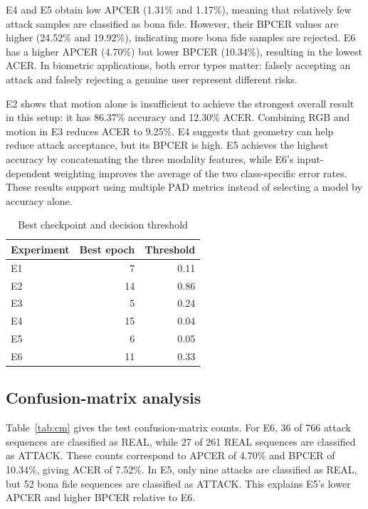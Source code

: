 \documentclass[a4paper,conference]{IEEEtran}
\begin{document}
E4 and E5 obtain low APCER (1.31\% and 1.17\%), meaning that relatively few attack samples are classified as bona fide. However, their BPCER values are higher (24.52\% and 19.92\%), indicating more bona fide samples are rejected. E6 has a higher APCER (4.70\%) but lower BPCER (10.34\%), resulting in the lowest ACER. In biometric applications, both error types matter: falsely accepting an attack and falsely rejecting a genuine user represent different risks.

E2 shows that motion alone is insufficient to achieve the strongest overall result in this setup: it has 86.37\% accuracy and 12.30\% ACER. Combining RGB and motion in E3 reduces ACER to 9.25\%. E4 suggests that geometry can help reduce attack acceptance, but its BPCER is high. E5 achieves the highest accuracy by concatenating the three modality features, while E6's input-dependent weighting improves the average of the two class-specific error rates. These results support using multiple PAD metrics instead of selecting a model by accuracy alone.

\begin{table}[t]
\caption{Best checkpoint and decision threshold}
\label{tab:thresholds}
\centering\footnotesize
\begin{tabular}{lrr}
\toprule
Experiment & Best epoch & Threshold \\
\midrule
E1 & 7 & 0.11 \\
E2 & 14 & 0.86 \\
E3 & 5 & 0.24 \\
E4 & 15 & 0.04 \\
E5 & 6 & 0.05 \\
E6 & 11 & 0.33 \\
\bottomrule
\end{tabular}
\end{table}

\subsection{Confusion-matrix analysis}
Table~\ref{tab:cm} gives the test confusion-matrix counts. For E6, 36 of 766 attack sequences are classified as REAL, while 27 of 261 REAL sequences are classified as ATTACK. These counts correspond to APCER of 4.70\% and BPCER of 10.34\%, giving ACER of 7.52\%. In E5, only nine attacks are classified as REAL, but 52 bona fide sequences are classified as ATTACK. This explains E5's lower APCER and higher BPCER relative to E6.
\end{document}
